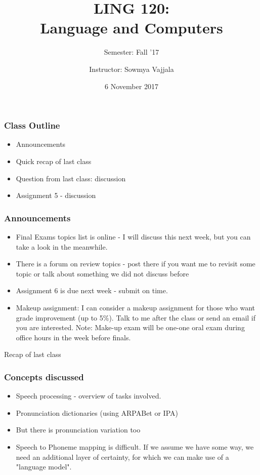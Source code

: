 \documentclass{beamer}
\author[Sowmya Vajjala]{Instructor: Sowmya Vajjala}
\title[LING 120]{LING 120: \\ Language and Computers}
\subtitle{Semester: Fall '17}
\date{6 November 2017}
\institute{Iowa State University, USA}
\begin{document}
\begin{frame}\titlepage
\end{frame}

\begin{frame}
\frametitle{Class Outline}
\begin{itemize}
\item Announcements
\item Quick recap of last class
\item Question from last class: discussion
\item Assignment 5 - discussion
\end{itemize}
\end{frame}

\begin{frame}
\frametitle{Announcements}
\begin{itemize}
\item Final Exams topics list is online - I will discuss this next week, but you can take a look in the meanwhile. 
\item There is a forum on review topics - post there if you want me to revisit some topic or talk about something we did not discuss before
\item Assignment 6 is due next week - submit on time.
\item Makeup assignment: I can consider a makeup assignment for those who want grade improvement (up to 5\%). Talk to me after the class or send an email if you are interested. Note: Make-up exam will be one-one oral exam during office hours in the week before finals.
\end{itemize}
\end{frame}

\begin{frame}
\Large Recap of last class
\end{frame}

\begin{frame}
\frametitle{Concepts discussed}
\begin{itemize}
\item Speech processing - overview of tasks involved.
\item Pronunciation dictionaries (using ARPABet or IPA) \pause
\item But there is pronunciation variation too \pause
\item Speech to Phoneme mapping is difficult. If we assume we have some way, we need an additional layer of certainty, for which we can make use of a "language model".
\end{itemize}
\end{frame}
\end{document}
